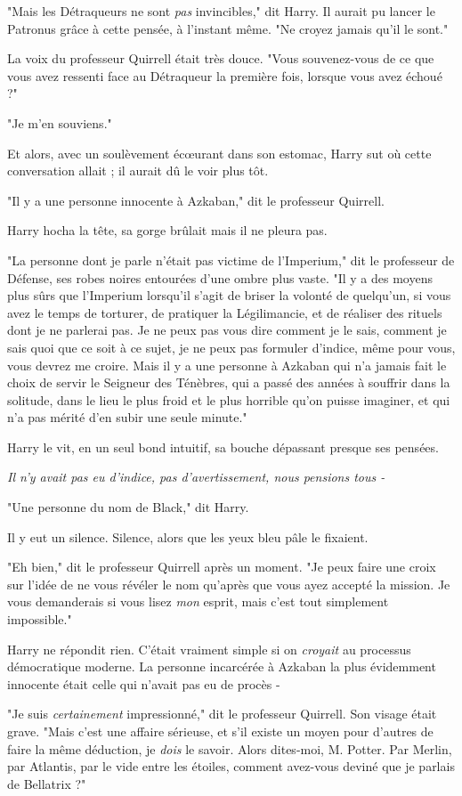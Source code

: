 "Mais les Détraqueurs ne sont \emph{pas}  invincibles," dit Harry. Il aurait pu lancer le Patronus grâce à cette pensée, à l'instant même. "Ne croyez jamais qu'il le sont."

La voix du professeur Quirrell était très douce. "Vous souvenez-vous de ce que vous avez ressenti face au Détraqueur la première fois, lorsque vous avez échoué ?"

"Je m'en souviens."

Et alors, avec un soulèvement écœurant dans son estomac, Harry sut où cette conversation allait ; il aurait dû le voir plus tôt.

"Il y a une personne innocente à Azkaban," dit le professeur Quirrell.

Harry hocha la tête, sa gorge brûlait mais il ne pleura pas.

"La personne dont je parle n'était pas victime de l'Imperium," dit le professeur de Défense, ses robes noires entourées d'une ombre plus vaste. "Il y a des moyens plus sûrs que l'Imperium lorsqu'il s'agit de briser la volonté de quelqu'un, si vous avez le temps de torturer, de pratiquer la Légilimancie, et de réaliser des rituels dont je ne parlerai pas. Je ne peux pas vous dire comment je le sais, comment je sais quoi que ce soit à ce sujet, je ne peux pas formuler d'indice, même pour vous, vous devrez me croire. Mais il y a une personne à Azkaban qui n'a jamais fait le choix de servir le Seigneur des Ténèbres, qui a passé des années à souffrir dans la solitude, dans le lieu le plus froid et le plus horrible qu'on puisse imaginer, et qui n'a pas mérité d'en subir une seule minute."

Harry le vit, en un seul bond intuitif, sa bouche dépassant presque ses pensées.

\emph{Il n'y avait pas eu d'indice, pas d'avertissement, nous pensions tous -} 

"Une personne du nom de Black," dit Harry.

Il y eut un silence. Silence, alors que les yeux bleu pâle le fixaient.

"Eh bien," dit le professeur Quirrell après un moment. "Je peux faire une croix sur l'idée de ne vous révéler le nom qu'après que vous ayez accepté la mission. Je vous demanderais si vous lisez \emph{mon}  esprit, mais c'est tout simplement impossible."

Harry ne répondit rien. C'était vraiment simple si on \emph{croyait}  au processus démocratique moderne. La personne incarcérée à Azkaban la plus évidemment innocente était celle qui n'avait pas eu de procès -

"Je suis \emph{certainement}  impressionné," dit le professeur Quirrell. Son visage était grave. "Mais c'est une affaire sérieuse, et s'il existe un moyen pour d'autres de faire la même déduction, je \emph{dois}  le savoir. Alors dites-moi, M. Potter. Par Merlin, par Atlantis, par le vide entre les étoiles, comment avez-vous deviné que je parlais de Bellatrix ?"

